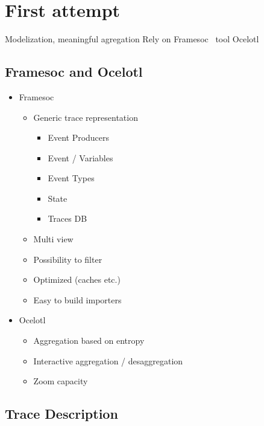 \section{First attempt}
\label{sec:visu-first}

Modelization, meaningful agregation
Rely on Framesoc~\cite{Pagano14frameSoC} tool Ocelotl~\cite{Dosimont14Ocelotl}

\subsection{Framesoc and Ocelotl}

\begin{itemize}
    \item \gls{Framesoc}
        \begin{itemize}
            \item Generic trace representation
                \begin{itemize}
                    \item Event Producers
                    \item Event / Variables
                    \item Event Types
                    \item State
                    \item Traces DB
                \end{itemize}
            \item Multi view
            \item Possibility to filter
            \item Optimized (caches etc.)
            \item Easy to build importers
        \end{itemize}
    \item \gls{Ocelotl}~\cite{Pagano13TraceRR}
        \begin{itemize}
            \item Aggregation based on entropy
            \item Interactive aggregation / desaggregation
            \item Zoom capacity
        \end{itemize}
\end{itemize}

\subsection{Trace Description}

